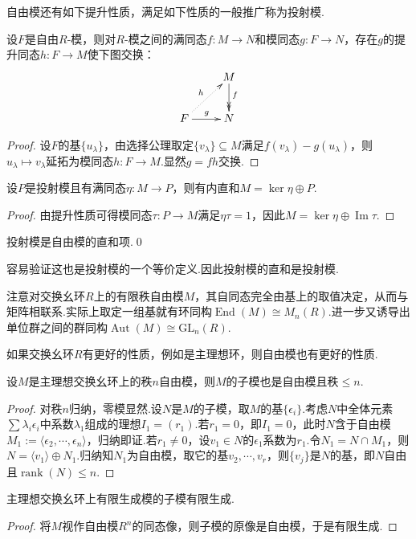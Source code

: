 自由模还有如下提升性质，满足如下性质的一般推广称为{\heiti 投射模}.
\begin{prop}[(自由模的提升性质)]
    设$F$是自由$R$-模，则对$R$-模之间的满同态$f\colon M\to N$和模同态$g\colon F\to N$，存在$g$的提升同态$h\colon F\to M$使下图交换：
    \[
    \xymatrix{
        &M\ar@{->>}[d]^(0.42)f\\
        F\ar[r]^g\ar@{.>}[ru]^h&N
    }
\]
\end{prop}
\begin{proof}
    设$F$的基$\{u_\lambda\}$，由选择公理取定$\{v_\lambda\}\subseteq M$满足$f(v_\lambda)-g(u_\lambda)$，则$u_\lambda\mapsto v_\lambda$延拓为模同态$h\colon F\to M$.显然$g=fh$交换.
\end{proof}
\begin{prop}
    设$P$是投射模且有满同态$\eta\colon M\to P$，则有内直和$M=\ker\eta\oplus P$.
\end{prop}
\begin{proof}
    由提升性质可得模同态$\tau\colon P\to M$满足$\eta\tau=1$，因此$M=\ker\eta\oplus\operatorname*{Im}\tau$.
\end{proof}
\begin{cor*}
    投射模是自由模的直和项.\qed
\end{cor*}
\begin{remark}
    容易验证这也是投射模的一个等价定义.因此投射模的直和是投射模.
\end{remark}

注意对交换幺环$R$上的有限秩自由模$M$，其自同态完全由基上的取值决定，从而与矩阵相联系.实际上取定一组基就有环同构$\operatorname*{End}(M)\cong M_n(R)$.进一步又诱导出单位群之间的群同构$\operatorname*{Aut}(M)\cong\mathrm{GL}_n(R)$.

如果交换幺环$R$有更好的性质，例如是主理想环，则自由模也有更好的性质.
\begin{prop}
    设$M$是主理想交换幺环上的秩$n$自由模，则$M$的子模也是自由模且秩$\le n$.
\end{prop}
\begin{proof}
    对秩$n$归纳，零模显然.设$N$是$M$的子模，取$M$的基$\{\epsilon_i\}$.考虑$N$中全体元素$\sum\lambda_i\epsilon_i$中系数$\lambda_1$组成的理想$I_1=(r_1)$.若$r_1=0$，即$I_1=0$，此时$N$含于自由模$M_1:=\langle \epsilon_2,\cdots,\epsilon_n\rangle $，归纳即证.若$r_1\ne 0$，设$v_1\in N$的$\epsilon_1$系数为$r_1$.令$N_1=N\cap M_1$，则$N=\langle v_1\rangle\oplus N_1$.归纳知$N_1$为自由模，取它的基$v_2,\cdots,v_r$，则$\{v_j\}$是$N$的基，即$N$自由且$\operatorname*{rank}(N)\le n$.
\end{proof}
\begin{cor*}
    主理想交换幺环上有限生成模的子模有限生成.
\end{cor*}
\begin{proof}
    将$M$视作自由模$R^n$的同态像，则子模的原像是自由模，于是有限生成.
\end{proof}

